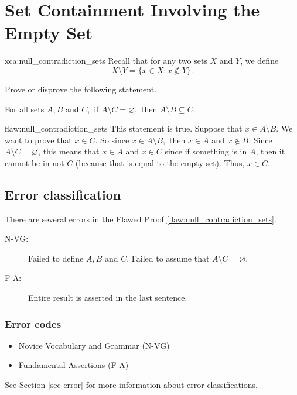 \section{Set Containment Involving the Empty Set}

\begin{xca}{xca:null_contradiction_sets}
Recall that for any two sets $X$ and $Y$, we define 
\[ X \setminus Y = \{ x\in X : x \notin Y \}. \]

\noindent Prove or disprove the following statement. 

\noindent For all sets $A,B$ and $C,$ if $A \setminus C = \varnothing,$ then $A \setminus B \subseteq C.$
\end{xca}

\begin{flaw}{flaw:null_contradiction_sets} 
This statement is true. Suppose that $x \in A \setminus B.$ We want to prove that $x \in C$. So since $x \in A \setminus B,$ then $x \in A$ and $x \notin B$. Since $A \setminus C = \varnothing$, this means that $x \in A$ and $x \in C$ since if something is in $A$, then it cannot be in not $C$ (because that is equal to the empty set). Thus, $x \in C.$ 
\end{flaw}

\clearpage
\subsection{Error classification}

There are several errors
 in the Flawed Proof \ref{flaw:null_contradiction_sets}.

 
 \begin{description}
 	\item[N-VG:] Failed to define $A, B$ and $C$. Failed to assume that $A \setminus C = \varnothing.$
 	\item[F-A:] Entire result is asserted in the last sentence. 
 \end{description}

 
\subsubsection{Error codes}
\begin{itemize}
	\item 	Novice Vocabulary and Grammar (N-VG)
	\item   Fundamental Assertions (F-A)
\end{itemize}
See Section \ref{sec-error} for more information about error classifications.

